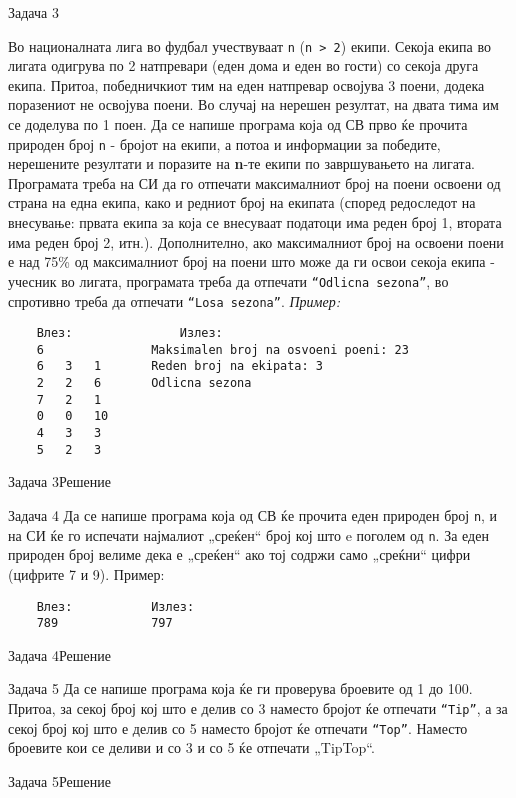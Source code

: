 \begin{frame}[fragile]{Задача 3}
\begin{tiny}
Во националната лига во фудбал учествуваат \texttt{n} (\texttt{n > 2}) екипи.
Секоја екипа во лигата одигрува по 2 натпревари (еден дома и еден во гости) со секоја друга
екипа. Притоа, победничкиот тим на еден натпревар освојува 3 поени, додека
поразениот не освојува поени. Во случај на нерешен резултат, на двата тима им се
доделува по 1 поен.
Да се напише програма која од СВ прво ќе прочита природен број \texttt{n} - бројот на
екипи, а потоа и информации за победите, нерешените резултати и поразите на 
\textbf{n}-те екипи по завршувањето на лигата. Програмата треба на СИ да го
отпечати максималниот број на поени освоени од страна на една екипа, како и
редниот број на екипата (според редоследот на внесување: првата екипа за која се
внесуваат податоци има реден број 1, втората има реден број 2, итн.).
Дополнително, ако максималниот број на освоени поени е над 75\% од максималниот
број на поени што може да ги освои секоја екипа - учесник во лигата, програмата
треба да отпечати \texttt{``Odlicna sezona''}, во спротивно треба да отпечати
\texttt{``Losa sezona''}.
\emph{Пример:}
\begin{verbatim}
	Влез:				Излез:
	6               Maksimalen broj na osvoeni poeni: 23
	6   3   1	    Reden broj na ekipata: 3
	2   2   6	    Odlicna sezona
	7   2   1
	0   0   10
	4   3   3
	5   2   3
\end{verbatim}
\end{tiny}
\end{frame}

\begin{frame}[fragile]{Задача 3}{Решение}

\end{frame}

\begin{frame}[fragile]{Задача 4}
Да се напише програма која од СВ ќе прочита еден природен број \texttt{n}, и на
СИ ќе го испечати најмалиот „среќен“ број кој што e поголем од \texttt{n}. За еден
природен број велиме дека е „среќен“ ако тој содржи само „среќни“ цифри (цифрите
7 и 9).
Пример:
\begin{verbatim}
	Влез:			Излез:
	789				797
\end{verbatim}

\end{frame}

\begin{frame}[fragile]{Задача 4}{Решение}

\end{frame}

\begin{frame}[fragile]{Задача 5}
Да се напише програма која ќе ги проверува броевите од 1 до 100. Притоа, за
секој број кој што е делив со 3 наместо бројот ќе отпечати \texttt{``Tip''}, а за секој
број кој што е делив со 5 наместо бројот ќе отпечати \texttt{``Top''}. Наместо
броевите кои се деливи и со 3 и со 5 ќе отпечати „TipTop“.
\end{frame}

\begin{frame}[fragile]{Задача 5}{Решение}

\end{frame}
